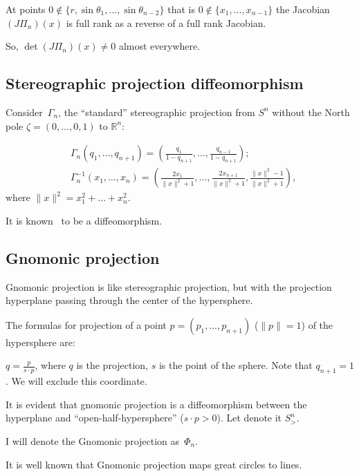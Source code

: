 \documentclass[oneside,draft]{amsart}
\begin{document}
At points $0\notin\{r,\sin\theta_1,\dots,\sin\theta_{n-2}\}$ that is $0\notin\{x_1,\dots,x_{n-1}\}$ the Jacobian $(J\Pi_n)(x)$
is full rank as a reverse of a full rank Jacobian.

So, $\det (J\Pi_n)(x)\ne 0$ almost everywhere.

\subsection{Stereographic projection diffeomorphism}

Consider~$\Gamma_n$, the ``standard'' stereographic projection from $S^n$ without the North pole $\zeta=(0,\dots,0,1)$ to $\mathbb{R}^n$: 

\begin{align*}
&\Gamma_n(q_1,\dots,q_{n+1}) = \left(\frac{q_1}{1-q_{n+1}},\dots,\frac{q_{n-1}}{1-q_{n+1}}\right);\\
&\Gamma_n^{-1}(x_1,\dots,x_n) = \left(\frac{2x_1}{\lVert x\rVert^2+1},\dots,\frac{2x_{n+1}}{\lVert x\rVert^2+1},\frac{\lVert x\rVert^2-1}{\lVert x\rVert^2+1}\right),
\end{align*}
where $\lVert x\rVert^2 = x_1^2+\dots+x_n^2$.

It is known~\cite{stereo} to be a diffeomorphism.

\subsection{Gnomonic projection}

Gnomonic projection is like stereographic projection, but with the projection hyperplane passing through the center of the hypersphere.


The formulas for projection of a point $p=(p_1,\dots,p_{n+1})$ ($\lVert p\rVert = 1$) of the hypersphere are:

$q=\frac{p}{s\cdot p}$, where $q$ is the projection, $s$ is the point of the sphere. Note that $q_{n+1}=1$. We will exclude this coordinate.

It is evident  that gnomonic projection is a diffeomorphism between the hyperplane and ``open-half-hy\-per\-sphe\-re'' ($s\cdot p>0$). Let denote it $S^n_{>}$.

I will denote the Gnomonic projection as~$\Phi_n$.

It is well known that Gnomonic projection maps great circles to lines.
\end{document}
